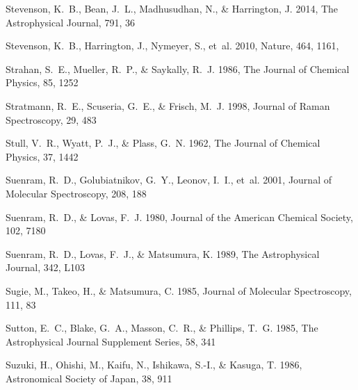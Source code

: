 \documentclass[twocolumn]{aastex631}
\begin{document}
\begin{thebibliography}{}
Stevenson, K.~B., Bean, J.~L., Madhusudhan, N., \& Harrington, J. 2014, The
  Astrophysical Journal, 791, 36

{Stevenson}, K.~B., {Harrington}, J., {Nymeyer}, S., {et~al.} 2010, Nature,
  464, 1161, 

Strahan, S.~E., Mueller, R.~P., \& Saykally, R.~J. 1986, The Journal of
  Chemical Physics, 85, 1252

Stratmann, R.~E., Scuseria, G.~E., \& Frisch, M.~J. 1998, Journal of Raman
  Spectroscopy, 29, 483

Stull, V.~R., Wyatt, P.~J., \& Plass, G.~N. 1962, The Journal of Chemical
  Physics, 37, 1442

Suenram, R.~D., Golubiatnikov, G.~Y., Leonov, I.~I., {et~al.} 2001, Journal of
  Molecular Spectroscopy, 208, 188

Suenram, R.~D., \& Lovas, F.~J. 1980, Journal of the American Chemical Society,
  102, 7180

Suenram, R.~D., Lovas, F.~J., \& Matsumura, K. 1989, The Astrophysical Journal,
  342, L103

Sugie, M., Takeo, H., \& Matsumura, C. 1985, Journal of Molecular Spectroscopy,
  111, 83

Sutton, E.~C., Blake, G.~A., Masson, C.~R., \& Phillips, T.~G. 1985, The
  Astrophysical Journal Supplement Series, 58, 341

Suzuki, H., Ohishi, M., Kaifu, N., Ishikawa, S.-I., \& Kasuga, T. 1986,
  Astronomical Society of Japan, 38, 911


\end{thebibliography}
\end{document}
